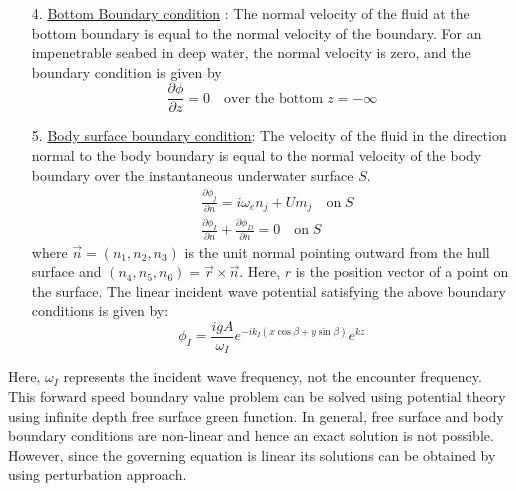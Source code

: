 \begin{itemize}
    \item[4.] \underline{Bottom Boundary condition} :
    The normal velocity of the fluid at the bottom boundary is equal to the normal velocity of the boundary. For an impenetrable seabed in deep water, the normal velocity is zero, and the boundary condition is given by 
    \begin{equation}
        \frac{\partial \phi}{\partial z} = 0 \quad \text{over the bottom}\; z = -\infty
    \end{equation}
    \item[5.] \underline{Body surface boundary condition}:
    The velocity of the fluid in the direction normal to the body boundary is equal to the normal velocity of the body boundary over the instantaneous underwater surface $S$.
    \begin{align}
        \label{eq:body_surface_boundary_cond}
        &\frac{\partial \phi_j}{\partial n} = i\omega_e n_j + Um_j \quad \text{on}\; S \\
        &\frac{\partial \phi_I}{\partial n} + \frac{\partial \phi_D}{\partial n} = 0 \quad \text{on}\; S
    \end{align}
    where $\vec{n} = (n_1, n_2, n_3)$ is the unit normal pointing outward from the hull surface and $(n_4, n_5, n_6)=\vec{r}\times \vec{n}$. Here, $r$ is the position vector of a point on the surface.
    The linear incident wave potential satisfying the above boundary conditions is given by:
    \begin{equation}
        \phi_I = \frac{igA}{\omega_I} e^{-ik_I(x\cos \beta + y\sin \beta)}e^{kz}
    \end{equation}
\end{itemize}

 Here, $\omega_I$ represents the incident wave frequency, not the encounter frequency.
This forward speed boundary value problem can be solved using potential theory using 
infinite depth free surface green function. In general, free surface and body boundary conditions 
are non-linear and hence an exact solution is not possible. However, since the governing equation
is linear its solutions can be obtained by using perturbation approach.